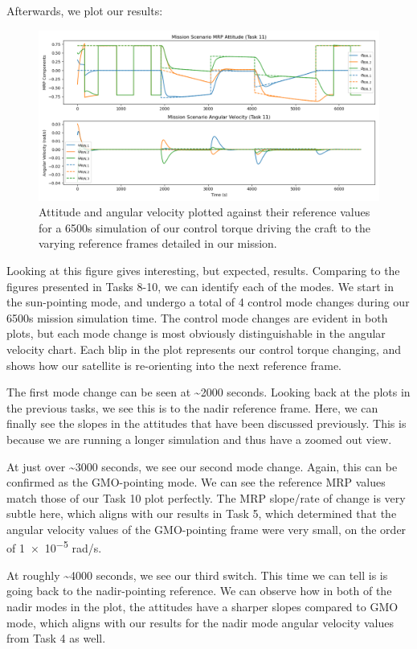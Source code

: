 \documentclass[conf]{new-aiaa}
\begin{document}
Afterwards, we plot our results:
\begin{figure}[H]
    \centering
    \captionsetup{width=.7\linewidth}
    \includegraphics[width=1\linewidth]{task11_mission_scenario.png}
    \caption{Attitude and angular velocity plotted against their reference values for a 6500s simulation of our control torque driving the craft to the varying reference frames detailed in our mission.}
    \label{fig:enter-label}
\end{figure}
Looking at this figure gives interesting, but expected, results. Comparing to the figures presented in Tasks 8-10, we can identify each of the modes. We start in the sun-pointing mode, and undergo a total of 4 control mode changes during our 6500s mission simulation time. The control mode changes are evident in both plots, but each mode change is most obviously distinguishable in the angular velocity chart. Each blip in the plot represents our control torque changing, and shows how our satellite is re-orienting into the next reference frame.

The first mode change can be seen at \textasciitilde2000 seconds. Looking back at the plots in the previous tasks, we see this is to the nadir reference frame. Here, we can finally see the slopes in the attitudes that have been discussed previously. This is because we are running a longer simulation and thus have a zoomed out view. 

At just over \textasciitilde3000 seconds, we see our second mode change. Again, this can be confirmed as the GMO-pointing mode. We can see the reference MRP values match those of our Task 10 plot perfectly. The MRP slope/rate of change is very subtle here, which aligns with our results in Task 5, which determined that the angular velocity values of the GMO-pointing frame were very small, on the order of \num{1e-5} rad/s.

At roughly \textasciitilde4000 seconds, we see our third switch. This time we can tell is is going back to the nadir-pointing reference. We can observe how in both of the nadir modes in the plot, the attitudes have a sharper slopes compared to GMO mode, which aligns with our results for the nadir mode angular velocity values from Task 4 as well. 
\end{document}
